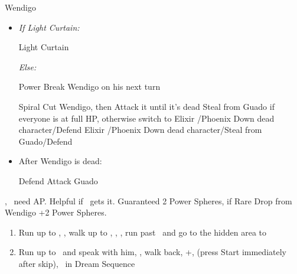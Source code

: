 \bothcb
{}
\begin{battle}[18000]{Wendigo}
    \begin{itemize}
        \tidusf Haste \tidus
        \tidusf Switch Weapon to Brotherhood
        \tidusf Attack Guado B (Top One)
        \item \textit{If Light Curtain:}
        \begin{itemize}
            \rikkuf Light Curtain \tidus
        \end{itemize}
        \textit{Else:}
        \begin{itemize}
            \switch{\rikku}{\auron}
            \auronf Power Break Wendigo
            \switch{\auron}{\rikku} on his next turn
        \end{itemize}
        \tidusf Spiral Cut Wendigo, then Attack it until it's dead
        \kimahrif Steal from Guado if everyone is at full HP, otherwise switch to \lulu
        \luluf Elixir \tidus/Phoenix Down dead character/Defend
        \rikkuf Elixir \tidus/Phoenix Down dead character/Steal from Guado/Defend
        \item After Wendigo is dead:
        \begin{itemize}
            \yunaf Defend
            \tidusf Attack Guado
        \end{itemize}
    \end{itemize}
    \yuna, \tidus\ need AP. Helpful if \lulu\ gets it.
    Guaranteed 2 Power Spheres, if Rare Drop from Wendigo +2 Power Spheres.
\end{battle}
\begin{enumerate}[resume]
    \item Run up to \rikku, \sd, walk up to \yuna, \sd, \save, run past \kimahri\ and go to the hidden area to 
    \item Run up to \auron\ and speak with him, \sd, walk back, \cs+\skippablefmv[1:00], (press Start immediately after skip), \sd\ in Dream Sequence
\end{enumerate}
\lossnp\bothcb\bothnpsingle
